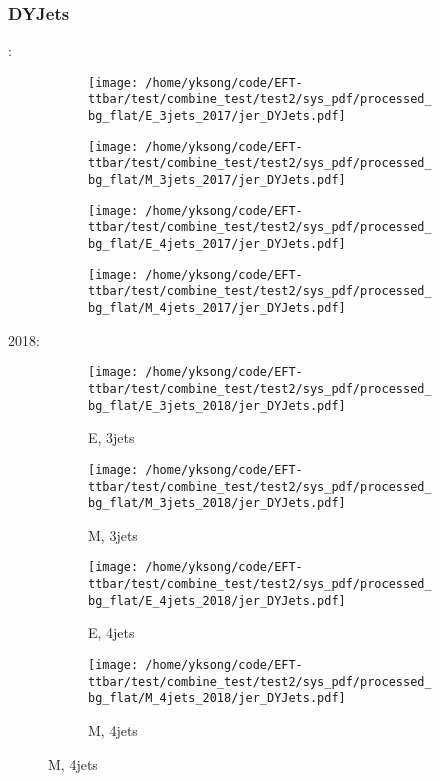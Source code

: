 \documentclass{beamer}
\begin{document}
\begin{frame}
\frametitle{DYJets}
\fontsize{5}{1}:
\begin{figure}
\centering
\begin{subfigure}[b]{0.24\textwidth}
\texttt{[image: /home/yksong/code/EFT-ttbar/test/combine\_test/test2/sys\_pdf/processed\_bg\_flat/E\_3jets\_2017/jer\_DYJets.pdf]}
\end{subfigure}
\begin{subfigure}[b]{0.24\textwidth}
\texttt{[image: /home/yksong/code/EFT-ttbar/test/combine\_test/test2/sys\_pdf/processed\_bg\_flat/M\_3jets\_2017/jer\_DYJets.pdf]}
\end{subfigure}
\begin{subfigure}[b]{0.24\textwidth}
\texttt{[image: /home/yksong/code/EFT-ttbar/test/combine\_test/test2/sys\_pdf/processed\_bg\_flat/E\_4jets\_2017/jer\_DYJets.pdf]}
\end{subfigure}
\begin{subfigure}[b]{0.24\textwidth}
\texttt{[image: /home/yksong/code/EFT-ttbar/test/combine\_test/test2/sys\_pdf/processed\_bg\_flat/M\_4jets\_2017/jer\_DYJets.pdf]}
\end{subfigure}
\end{figure}
2018:
\begin{figure}
\centering
\begin{subfigure}[b]{0.24\textwidth}
\texttt{[image: /home/yksong/code/EFT-ttbar/test/combine\_test/test2/sys\_pdf/processed\_bg\_flat/E\_3jets\_2018/jer\_DYJets.pdf]}
\captionsetup{font=tiny}
\caption{E, 3jets}
\end{subfigure}
\begin{subfigure}[b]{0.24\textwidth}
\texttt{[image: /home/yksong/code/EFT-ttbar/test/combine\_test/test2/sys\_pdf/processed\_bg\_flat/M\_3jets\_2018/jer\_DYJets.pdf]}
\captionsetup{font=tiny}
\caption{M, 3jets}
\end{subfigure}
\begin{subfigure}[b]{0.24\textwidth}
\texttt{[image: /home/yksong/code/EFT-ttbar/test/combine\_test/test2/sys\_pdf/processed\_bg\_flat/E\_4jets\_2018/jer\_DYJets.pdf]}
\captionsetup{font=tiny}
\caption{E, 4jets}
\end{subfigure}
\begin{subfigure}[b]{0.24\textwidth}
\texttt{[image: /home/yksong/code/EFT-ttbar/test/combine\_test/test2/sys\_pdf/processed\_bg\_flat/M\_4jets\_2018/jer\_DYJets.pdf]}
\captionsetup{font=tiny}
\caption{M, 4jets}
\end{subfigure}
\end{figure}
\end{frame}
\end{document}
